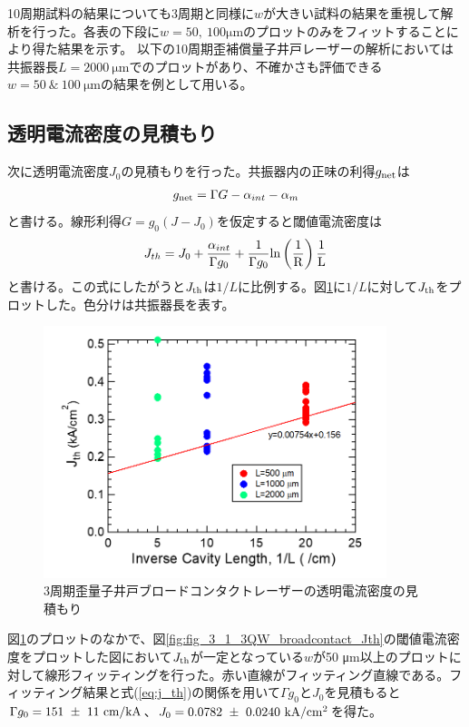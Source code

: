 {10周期試料の結果についても3周期と同様に$w$が大きい試料の結果を重視して解析を行った。各表の下段に$w=50, \ 100\si{\micro\metre}$のプロットのみをフィットすることにより得た結果を示す。
以下の10周期歪補償量子井戸レーザーの解析においては共振器長$L=2000\ \si{\micro\metre}$でのプロットがあり、不確かさも評価できる$w=50\ \&\ 100\ \si{ \micro\metre}$の結果を例として用いる。

\clearpage
\subsection{透明電流密度の見積もり}

次に透明電流密度$J_{0}$の見積もりを行った。共振器内の正味の利得$g_{\rm{net}}$は
\begin{eqnarray}
g_{\rm{net}}=\Gamma G-\alpha_{int}-\alpha_{m}
\label{eq:eta_j0}
\end{eqnarray}
と書ける。線形利得$G=g_{0}(J-J_{0})$を仮定すると閾値電流密度は
\begin{eqnarray}
J_{th}=J_{0}+\dfrac{\alpha_{int}}{\Gamma g_{0}}+\dfrac{1}{\Gamma g_{0}}\rm{ln}\left(\dfrac{1}{R}\right)\dfrac{1}{L}
\label{eq:j_th}
\end{eqnarray}
と書ける。この式にしたがうと$J_{\rm{th}}$は$1/L$に比例する。図\ref{fig:fig_3_1_3QW_broadcontact_j0}に$1/L$に対して$J_{\rm{th}}$をプロットした。色分けは共振器長を表す。
\begin{figure}[h]
	\centering
	\includegraphics[width=10cm]{figure/fig_3_1_3QW_broadcontact_j0.png}
	\caption{3周期歪量子井戸ブロードコンタクトレーザーの透明電流密度の見積もり}
	\label{fig:fig_3_1_3QW_broadcontact_j0}
\end{figure}

図\ref{fig:fig_3_1_3QW_broadcontact_j0}のプロットのなかで、図\ref{fig:fig_3_1_3QW_broadcontact_Jth}の閾値電流密度をプロットした図において$J_{\rm{th}}$が一定となっている$w$が50 \si{\micro\metre}以上のプロットに対して線形フィッティングを行った。赤い直線がフィッティング直線である。フィッティング結果と式(\ref{eq:j_th})の関係を用いて$\Gamma g_{0}$と$J_{0}$を見積もると$\Gamma g_{0}=151 \ \pm \ 11\ \rm{ cm/kA}$、$J_{0}=0.0782 \ \pm \ 0.0240 \ \rm{kA/cm^{2}}$を得た。%


}
